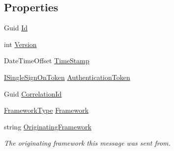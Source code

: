 \subsection*{Properties}
\begin{DoxyCompactItemize}
\item 
Guid \hyperlink{classCqrs_1_1Tests_1_1Substitutes_1_1TestAggregateCreated_a04a32dd7189e698ba295cbfcf7e0d329_a04a32dd7189e698ba295cbfcf7e0d329}{Id}
\item 
int \hyperlink{classCqrs_1_1Tests_1_1Substitutes_1_1TestAggregateCreated_ab0ea0893cbb96c0f88237a489600d8cc_ab0ea0893cbb96c0f88237a489600d8cc}{Version}
\item 
Date\+Time\+Offset \hyperlink{classCqrs_1_1Tests_1_1Substitutes_1_1TestAggregateCreated_ab864456a26c4508ad2e071fe9fefa800_ab864456a26c4508ad2e071fe9fefa800}{Time\+Stamp}
\item 
\hyperlink{interfaceCqrs_1_1Authentication_1_1ISingleSignOnToken}{I\+Single\+Sign\+On\+Token} \hyperlink{classCqrs_1_1Tests_1_1Substitutes_1_1TestAggregateCreated_a6d3d371ff4be9f42857c04e6ccbcab05_a6d3d371ff4be9f42857c04e6ccbcab05}{Authentication\+Token}
\item 
Guid \hyperlink{classCqrs_1_1Tests_1_1Substitutes_1_1TestAggregateCreated_aacb3f1b22d6d793969aaba32978fdef7_aacb3f1b22d6d793969aaba32978fdef7}{Correlation\+Id}
\item 
\hyperlink{namespaceCqrs_1_1Messages_af06a7e6cd2609043d0f2f5f3419f81e3_af06a7e6cd2609043d0f2f5f3419f81e3}{Framework\+Type} \hyperlink{classCqrs_1_1Tests_1_1Substitutes_1_1TestAggregateCreated_abc5d7db43344513944dbc85f1d4cac56_abc5d7db43344513944dbc85f1d4cac56}{Framework}
\item 
string \hyperlink{classCqrs_1_1Tests_1_1Substitutes_1_1TestAggregateCreated_aa1eadfaa9c402b0744d178105e3fe7be_aa1eadfaa9c402b0744d178105e3fe7be}{Originating\+Framework}
\begin{DoxyCompactList}\small\item\em The originating framework this message was sent from. \end{DoxyCompactList}\item 

\end{DoxyCompactItemize}
